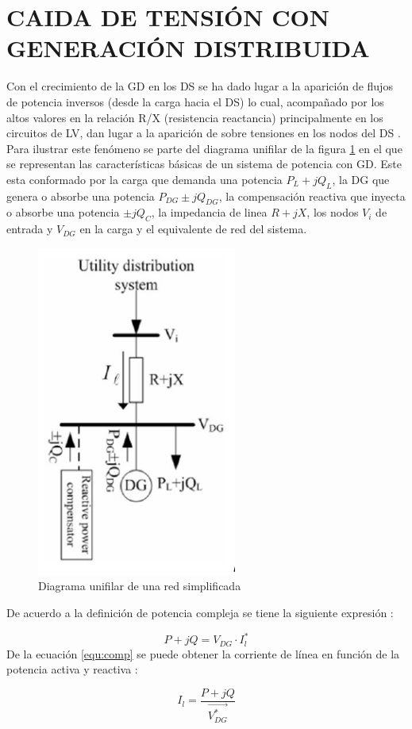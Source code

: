 \documentclass[12pt, letterpaper]{report}
\begin{document}
\section{CAIDA DE TENSIÓN CON GENERACIÓN DISTRIBUIDA}
Con el crecimiento de la GD \cite{Cao2016} en los DS se ha dado lugar a la aparición de flujos de potencia inversos (desde la carga hacia el DS) lo cual, acompañado por los altos valores en la relación R/X (resistencia reactancia) principalmente en los circuitos de LV, dan lugar a la aparición de sobre tensiones en los nodos del  DS \cite{su2009comparative}\cite{Tang2017}.\\
Para ilustrar este fenómeno se parte  del diagrama unifilar de la figura \ref{fig:dos_nodos} en el que se representan las características básicas de un sistema de potencia con GD. Este esta conformado por la carga que demanda una potencia $P_{L}+jQ_{L}$, la DG que genera o absorbe una potencia $P_{DG}\pm jQ_{DG}$,  la compensación reactiva que inyecta o absorbe una potencia $\pm jQ_{C}$, la impedancia de linea $R+jX$,  los nodos $V_{i} $ de entrada y $V_{DG}$ en la carga y el equivalente de red del sistema.\\
\begin{figure}[H]
    \centering
    \caption{Diagrama unifilar de una red simplificada}
    \label{fig:dos_nodos}
    \includegraphics[width=0.2\linewidth]{imagenes/cap_1/dos_nodos}
\end{figure}
De acuerdo a la definición de potencia compleja se tiene la siguiente expresión \cite{Akagi2017}:

\begin{equation}
\label{equ:comp}
P + jQ = V_{DG} \cdot I_{l}^{*}
\end{equation}
De la ecuación \ref{equ:comp}  se puede obtener  la corriente de línea en función de la potencia activa y reactiva :

\begin{equation}
I_{l}= \dfrac{P + jQ}{\overrightarrow{V_{DG}^{*}}}
\label{eq:corriente}
\end{equation}
\end{document}
